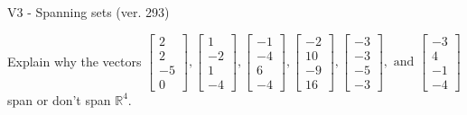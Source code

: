 \begin{exercise}
  \begin{exerciseTitle}V3 - Spanning sets (ver. 293)\end{exerciseTitle}
  \begin{exerciseStatement}
    Explain why the vectors \(\left[\begin{array}{r}
2 \\
2 \\
-5 \\
0
\end{array}\right] , \left[\begin{array}{r}
1 \\
-2 \\
1 \\
-4
\end{array}\right] , \left[\begin{array}{r}
-1 \\
-4 \\
6 \\
-4
\end{array}\right] , \left[\begin{array}{r}
-2 \\
10 \\
-9 \\
16
\end{array}\right] , \left[\begin{array}{r}
-3 \\
-3 \\
-5 \\
-3
\end{array}\right] , \text{ and } \left[\begin{array}{r}
-3 \\
4 \\
-1 \\
-4
\end{array}\right]\) span or don't span \(\mathbb{R}^4\). 
	



\end{exerciseStatement}
\end{exercise}
